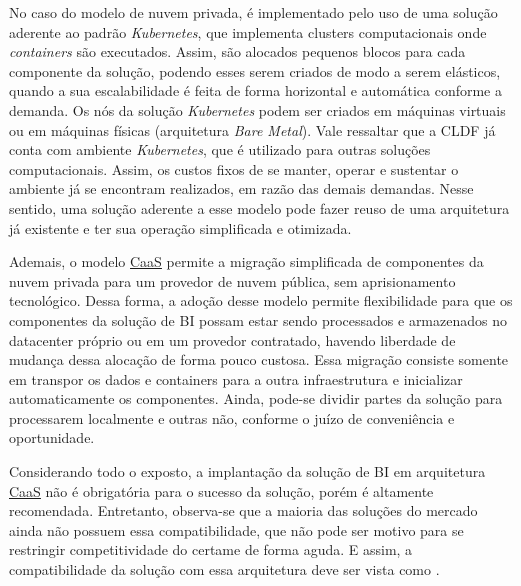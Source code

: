 No caso do modelo de nuvem privada, é implementado pelo uso de uma solução aderente ao padrão \emph{Kubernetes}, que implementa clusters computacionais onde \emph{containers} são executados. Assim, são alocados pequenos blocos para cada componente da solução, podendo esses serem criados de modo a serem elásticos, quando a sua escalabilidade é feita de forma horizontal e automática conforme a demanda. Os nós da solução \emph{Kubernetes} podem ser criados em máquinas virtuais ou em máquinas físicas (arquitetura \emph{Bare Metal}). Vale ressaltar que a CLDF já conta com ambiente \emph{Kubernetes}, que é utilizado para outras soluções computacionais. Assim, os custos fixos de se manter, operar e sustentar o ambiente já se encontram realizados, em razão das demais demandas. Nesse sentido, uma solução aderente a esse modelo pode fazer reuso de uma arquitetura já existente e ter sua operação simplificada e otimizada.

Ademais, o modelo \hyperref[caas]{CaaS} permite a migração simplificada de componentes da nuvem privada para um provedor de nuvem pública, sem aprisionamento tecnológico. Dessa forma, a adoção desse modelo permite flexibilidade para que os componentes da solução de BI possam estar sendo processados e armazenados no datacenter próprio ou em um provedor contratado, havendo liberdade de mudança dessa alocação de forma pouco custosa. Essa migração consiste somente em transpor os dados e containers para a outra infraestrutura e inicializar automaticamente os componentes. Ainda, pode-se dividir partes da solução para processarem localmente e outras não, conforme o juízo de conveniência e oportunidade.

Considerando todo o exposto, a implantação da solução de BI em arquitetura \hyperref[caas]{CaaS} não é obrigatória para o sucesso da solução, porém é altamente recomendada. Entretanto, observa-se que a maioria das soluções do mercado ainda não possuem essa compatibilidade, que não pode ser motivo para se restringir competitividade do certame de forma aguda. E assim, a compatibilidade da solução com essa arquitetura deve ser vista como \COULD.


